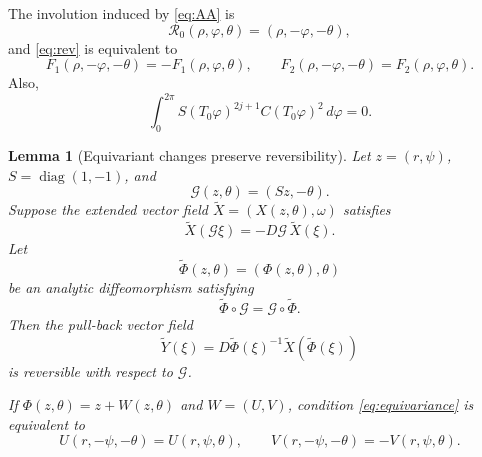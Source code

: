 \documentclass[11pt]{amsart}
\newtheorem{lemma}[theorem]{Lemma}
\theoremstyle{remark}
\newcommand{\cR}{\mathcal R}
\begin{document}
The involution induced by \eqref{eq:AA} is
\[
 \cR_0(\rho,\varphi,\theta)=(\rho,-\varphi,-\theta),
\]
and \eqref{eq:rev} is equivalent to
\begin{equation}\label{eq:Fparity}
 F_1(\rho,-\varphi,-\theta)=-F_1(\rho,\varphi,\theta),\qquad
 F_2(\rho,-\varphi,-\theta)= F_2(\rho,\varphi,\theta).
\end{equation}
Also,
\begin{equation}\label{eq:zeroaverage}
 \int_0^{2\pi}S(T_0\varphi)^{2j+1}
 C(T_0\varphi)^2\,d\varphi=0.
\end{equation}

\begin{lemma}[Equivariant changes preserve reversibility]
\label{lem:revchange}
Let $z=(r,\psi)$, $S=\operatorname{diag}(1,-1)$, and
\[
 \mathscr G(z,\theta)=(Sz,-\theta).
\]
Suppose the extended vector field
$\widetilde X=(X(z,\theta),\omega)$ satisfies
\begin{equation}\label{eq:revabstract}
 \widetilde X(\mathscr G\xi)
 =-D\mathscr G\,\widetilde X(\xi).
\end{equation}
Let
\[
 \widetilde\Phi(z,\theta)=(\Phi(z,\theta),\theta)
\]
be an analytic diffeomorphism satisfying
\begin{equation}\label{eq:equivariance}
 \widetilde\Phi\circ\mathscr G
 =\mathscr G\circ\widetilde\Phi .
\end{equation}
Then the pull-back vector field
\begin{equation}\label{eq:pullback}
 \widetilde Y(\xi)
 =D\widetilde\Phi(\xi)^{-1}
 \widetilde X(\widetilde\Phi(\xi))
\end{equation}
is reversible with respect to $\mathscr G$.

If $\Phi(z,\theta)=z+W(z,\theta)$ and $W=(U,V)$, condition
\eqref{eq:equivariance} is equivalent to
\begin{equation}\label{eq:UVequiv}
 U(r,-\psi,-\theta)=U(r,\psi,\theta),\qquad
 V(r,-\psi,-\theta)=-V(r,\psi,\theta).
\end{equation}
\end{lemma}
\end{document}
